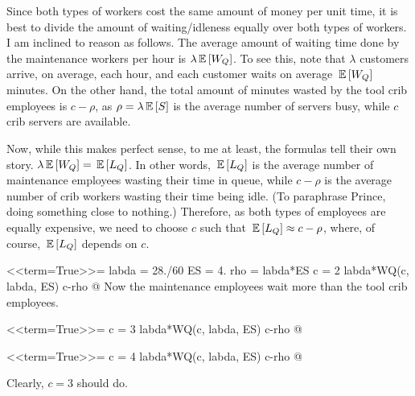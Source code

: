 \begin{question}
\begin{solution}
\begin{enumerate}
Since both types of workers cost the same amount of money per unit
time, it is best to divide the amount of waiting/idleness equally over
both types of workers.  I am inclined to reason as follows. The
average amount of waiting time done by the maintenance workers per
hour is $\lambda \,\mathbb{E}\left[W_Q\right]$. To see this, note that $\lambda$
customers arrive, on average, each hour, and each customer waits on
average $\,\mathbb{E}\left[W_Q\right]$ minutes. On the other hand, the total amount of
minutes wasted by the tool crib employees is $c-\rho$, as
$\rho = \lambda \,\mathbb{E}\left[S\right]$ is the average number of servers busy,
while $c$ crib servers are available.

Now, while this makes perfect sense, to me at least, the formulas tell
their own story. $\lambda\,\mathbb{E}\left[W_Q\right] = \,\mathbb{E}\left[L_Q\right]$. In other words,
$\,\mathbb{E}\left[L_Q\right]$ is the average number of maintenance employees wasting
their time in queue, while $c -\rho$ is the average number of
crib workers wasting their time being idle. (To paraphrase Prince,
doing something close to nothing.) Therefore, as both types of
employees are equally expensive, we need to choose $c$ such that
$\,\mathbb{E}\left[L_Q\right] \approx c- \rho$, where, of course, $\,\mathbb{E}\left[L_Q\right]$ depends on
$c$.

<<term=True>>=
labda = 28./60
ES = 4.
rho = labda*ES
c = 2
labda*WQ(c, labda, ES)
c-rho
@ 
Now the maintenance employees wait more than the tool crib employees.

<<term=True>>=
c = 3
labda*WQ(c, labda, ES)
c-rho
@ 

<<term=True>>=
c = 4
labda*WQ(c, labda, ES)
c-rho
@ 

Clearly, $c=3$ should do.
  \end{enumerate}
    \end{solution}
\end{question}


